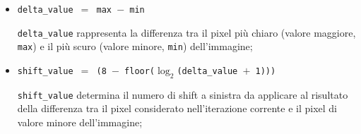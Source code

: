 \documentclass{article}
\begin{document}
\begin{itemize}
    \item   \texttt{delta\_value $=$ max $-$ min}\par
            \texttt{delta\_value} rappresenta la differenza tra il pixel più chiaro (valore maggiore, \texttt{max}) e il più scuro (valore minore, \texttt{min}) dell’immagine;
            \pagebreak
    \item   \texttt{shift\_value $=$ (8 $-$ floor\footnotemark($\log_{2} $(delta\_value $+$ 1)))}\par
            \texttt{shift\_value} determina il numero di shift a sinistra da applicare al risultato della differenza tra il pixel considerato nell’iterazione corrente e il pixel di valore minore dell’immagine;


\end{itemize}
\end{document}
